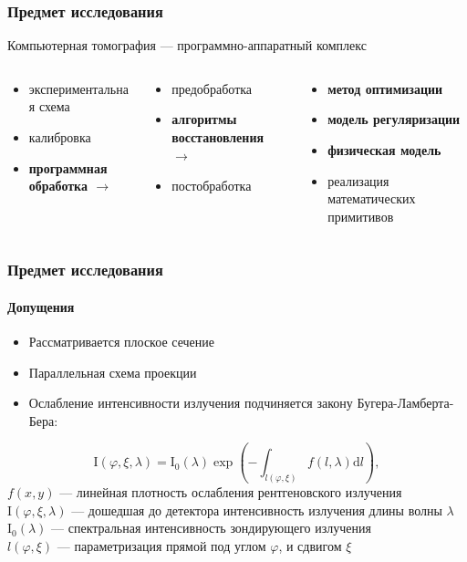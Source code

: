 \documentclass[12pt]{beamer}
\begin{document}
\begingroup

\begin{frame}
\frametitle{Предмет исследования}
Компьютерная томография --- программно-аппаратный комплекс
\setlength{\leftmargini}{0em}
\begin{columns}[T,onlytextwidth]
  \begin{column}{.4\textwidth}
  \begin{itemize}
    \item экспериментальная схема
    \item калибровка 
    \item \textbf{программная обработка $\rightarrow$}
  \end{itemize}
  \end{column}
  \pause
  \begin{column}[t]{0.4\linewidth}
  \begin{itemize}
    \item предобработка
    \item \textbf{алгоритмы восстановления $\rightarrow$}
    \item постобработка
  \end{itemize}
  \end{column}
  \pause
  \begin{column}[t]{0.35\linewidth}
  \begin{itemize}
    \item \textbf{метод оптимизации}
    \item \textbf{модель регуляризации}
    \item \textbf{физическая модель}
    \item реализация математических примитивов
  \end{itemize}
  \end{column}
\end{columns}
\end{frame}
\endgroup

\begin{frame}
\frametitle{Предмет исследования}
\framesubtitle{Допущения}
\begin{itemize}
  \item Рассматривается плоское сечение
  \item Параллельная схема проекции
  \item Ослабление интенсивности излучения подчиняется закону Бугера-Ламберта-Бера:
\end{itemize}
  $$
  \mathrm I \left( \varphi, \xi , \lambda \right) = \mathrm I_0(\lambda) \exp\left( {-\int_{l(\varphi, \xi)} \! f(l, \lambda) \mathrm d l }\right),
  $$
  \small
  $f(x, y)$ ---  линейная плотность ослабления рентгеновского излучения \\
  $\mathrm I(\varphi, \xi, \lambda)$ --- дошедшая до детектора интенсивность излучения длины волны $\lambda$ \\
  $\mathrm I_0(\lambda)$ --- спектральная интенсивность зондирующего излучения \\
  $l(\varphi, \xi)$ --- параметризация прямой под углом $\varphi$, и сдвигом $\xi$ \\
\end{frame}
\end{document}

